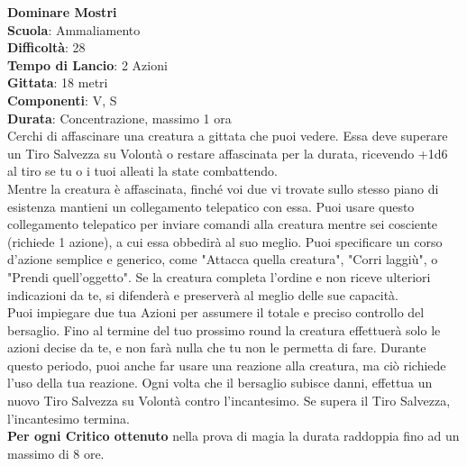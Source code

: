 \begin{multicols}{2}
\medskip\textbf{Dominare Mostri}\\
\textbf{Scuola}: Ammaliamento\\
\textbf{Difficoltà}: 28\\
\textbf{Tempo di Lancio}: 2 Azioni\\
\textbf{Gittata}: 18 metri\\
\textbf{Componenti}: V, S\\
\textbf{Durata}: Concentrazione, massimo 1 ora\\
Cerchi di affascinare una creatura a gittata che puoi vedere. Essa deve superare un Tiro Salvezza su Volontà o restare affascinata per la durata, ricevendo +1d6 al tiro se tu o i tuoi alleati la state combattendo.\\
Mentre la creatura è affascinata, finché voi due vi trovate sullo stesso piano di esistenza mantieni un collegamento telepatico con essa. Puoi usare questo collegamento telepatico per inviare comandi alla creatura mentre sei cosciente (richiede 1 azione), a cui essa obbedirà al suo meglio. Puoi specificare un corso d'azione semplice e generico, come "Attacca quella creatura", "Corri laggiù", o "Prendi quell'oggetto". Se la creatura completa l'ordine e non riceve ulteriori indicazioni da te, si difenderà e preserverà al meglio delle sue capacità.\\
Puoi impiegare due tua Azioni per assumere il totale e preciso controllo del bersaglio. Fino al termine del tuo prossimo round la creatura effettuerà solo le azioni decise da te, e non farà nulla che tu non le permetta di fare. Durante questo periodo, puoi anche far usare una reazione alla creatura, ma ciò richiede l'uso della tua reazione. Ogni volta che il bersaglio subisce danni, effettua un nuovo Tiro Salvezza su Volontà contro l'incantesimo. Se supera il Tiro Salvezza, l'incantesimo termina.\\
\textbf{Per ogni Critico ottenuto} nella prova di magia la durata raddoppia fino ad un massimo di 8 ore.


\end{multicols}
